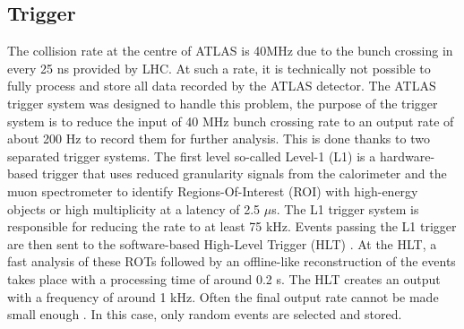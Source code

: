 \subsection{Trigger}
\label{chap2:ATLAS:Trigger}
The collision rate at the centre of ATLAS is 40MHz due to the bunch crossing in every 25 ns provided by LHC. At such a rate, it is technically not possible to fully process and store all data recorded by the ATLAS detector. The ATLAS trigger system was designed to handle this problem, the purpose of the trigger system is to reduce the input of 40 MHz bunch crossing rate to an output rate of about 200 Hz to record them for further analysis. This is done thanks to two separated trigger systems. The first level so-called Level-1 (L1) \cite{Trigger_L1} is a hardware-based trigger that uses reduced granularity signals from the calorimeter and the muon spectrometer to identify Regions-Of-Interest (ROI) with high-energy objects or high multiplicity at a latency of 2.5 $\mu$s. The L1 trigger system is responsible for reducing the rate to at least 75 kHz. Events passing the L1 trigger are then sent to the software-based High-Level Trigger (HLT) \cite{Trigger_HLT}. At the HLT, a fast analysis of these ROTs followed by an offline-like reconstruction of the events takes place with a processing time of around 0.2 s. The HLT creates an output with a frequency of around 1 kHz. Often the final output rate cannot be made small enough \cite{DQ}. In this case, only random events are selected and stored.


